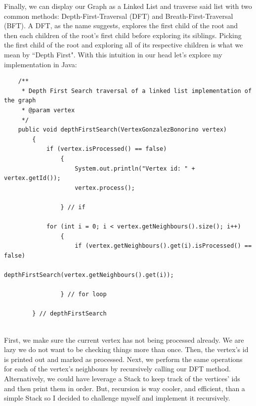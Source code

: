 \documentclass[letterpaper, 10pt]{article}
\begin{document}
Finally, we can display our Graph as a Linked List and traverse said list with two common methods: Depth-First-Traversal (DFT) and Breath-First-Traversal (BFT). A DFT, as the name suggests, explores the first child of the root and then each children of the root's first child before exploring its siblings. Picking the first child of the root and exploring all of its respective children is what we mean by ``Depth First". With this intuition in our head let's explore my implementation in Java:
\\
\begin{lstlisting}
    /**
     * Depth First Search traversal of a linked list implementation of the graph
     * @param vertex
     */
    public void depthFirstSearch(VertexGonzalezBonorino vertex)
	    {
	    	if (vertex.isProcessed() == false)
		    	{
		    		System.out.println("Vertex id: " + vertex.getId());
		    		vertex.process();
		    		
		    	} // if 
	    	
	    	for (int i = 0; i < vertex.getNeighbours().size(); i++)
		    	{
		    		if (vertex.getNeighbours().get(i).isProcessed() == false)
		    			depthFirstSearch(vertex.getNeighbours().get(i));
		    		
		    	} // for loop
	    	
	    } // depthFirstSearch
\end{lstlisting}
\\
First, we make sure the current vertex has not being processed already. We are lazy we do not want to be checking things more than once. Then, the vertex's id is printed out and marked as processed. Next, we perform the same operations for each of the vertex's neighbours by recursively calling our DFT method. Alternatively, we could have leverage a Stack to keep track of the vertices' ids and then print them in order. But, recursion is way cooler, and efficient, than a simple Stack so I decided to challenge myself and implement it recursively.
\end{document}
